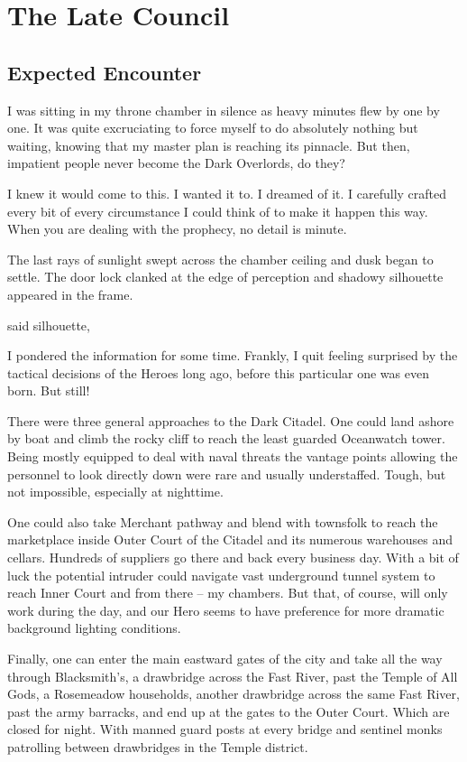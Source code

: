 \chapter{The Late Council}

\section{Expected Encounter}

I was sitting in my throne chamber in silence as heavy minutes flew by one by one. It was quite excruciating to force myself to do absolutely nothing but waiting, knowing that my master plan is reaching its pinnacle. But then, impatient people never become the Dark Overlords, do they?

I knew it would come to this. I wanted it to. I dreamed of it. I carefully crafted every bit of every circumstance I could think of to make it happen this way. When you are dealing with the prophecy, no detail is minute.

The last rays of sunlight swept across the chamber ceiling and dusk began to settle. The door lock clanked at the edge of perception and shadowy silhouette appeared in the frame.

 said silhouette, 

I pondered the information for some time. Frankly, I quit feeling surprised by the tactical decisions of the Heroes long ago, before this particular one was even born. But still!

There were three general approaches to the Dark Citadel. One could land ashore by boat and climb the rocky cliff to reach the least guarded Oceanwatch tower. Being mostly equipped to deal with naval threats the vantage points allowing the personnel to look directly down were rare and usually understaffed. Tough, but not impossible, especially at nighttime.

One could also take Merchant pathway and blend with townsfolk to reach the marketplace inside Outer Court of the Citadel and its numerous warehouses and cellars. Hundreds of suppliers go there and back every business day. With a bit of luck the potential intruder could navigate vast underground tunnel system to reach Inner Court and from there -- my chambers. But that, of course, will only work during the day, and our Hero seems to have preference for more dramatic background lighting conditions.

Finally, one can enter the main eastward gates of the city and take all the way through Blacksmith’s, a drawbridge across the Fast River, past the Temple of All Gods, a Rosemeadow households, another drawbridge across the same Fast River, past the army barracks, and end up at the gates to the Outer Court. Which are closed for night. With manned guard posts at every bridge and sentinel monks patrolling between drawbridges in the Temple district.

